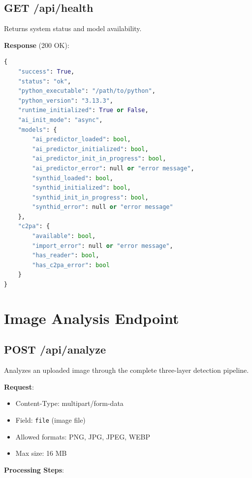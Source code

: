 \documentclass[12pt,a4paper]{book}
\begin{document}
\begin{itemize}
\subsection{GET /api/health}

Returns system status and model availability.

\textbf{Response} (200 OK):

\begin{lstlisting}[language=Python]
{
    "success": True,
    "status": "ok",
    "python_executable": "/path/to/python",
    "python_version": "3.13.3",
    "runtime_initialized": True or False,
    "ai_init_mode": "async",
    "models": {
        "ai_predictor_loaded": bool,
        "ai_predictor_initialized": bool,
        "ai_predictor_init_in_progress": bool,
        "ai_predictor_error": null or "error message",
        "synthid_loaded": bool,
        "synthid_initialized": bool,
        "synthid_init_in_progress": bool,
        "synthid_error": null or "error message"
    },
    "c2pa": {
        "available": bool,
        "import_error": null or "error message",
        "has_reader": bool,
        "has_c2pa_error": bool
    }
}
\end{lstlisting}

\section{Image Analysis Endpoint}

\subsection{POST /api/analyze}

Analyzes an uploaded image through the complete three-layer detection pipeline.

\textbf{Request}:
\begin{itemize}
    \item Content-Type: multipart/form-data
    \item Field: \texttt{file} (image file)
    \item Allowed formats: PNG, JPG, JPEG, WEBP
    \item Max size: 16 MB
\end{itemize}

\textbf{Processing Steps}:


\end{itemize}
\end{document}
